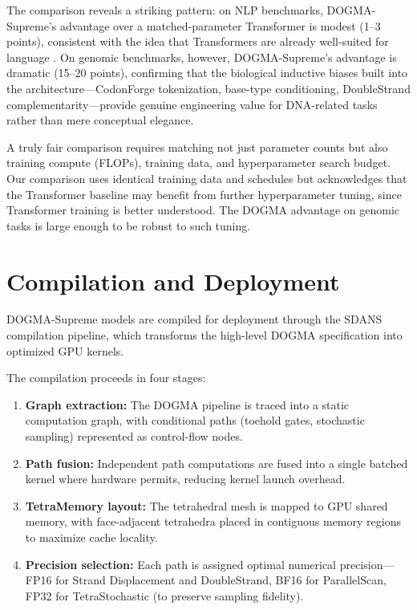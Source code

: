 The comparison reveals a striking pattern: on NLP benchmarks, DOGMA-Supreme's advantage over a matched-parameter Transformer is modest (1--3 points), consistent with the idea that Transformers are already well-suited for language \citep{vaswani2017attention}. On genomic benchmarks, however, DOGMA-Supreme's advantage is dramatic (15--20 points), confirming that the biological inductive biases built into the architecture---CodonForge tokenization, base-type conditioning, DoubleStrand complementarity---provide genuine engineering value for DNA-related tasks rather than mere conceptual elegance.

\begin{implnote}
A truly fair comparison requires matching not just parameter counts but also training compute (FLOPs), training data, and hyperparameter search budget. Our comparison uses identical training data and schedules but acknowledges that the Transformer baseline may benefit from further hyperparameter tuning, since Transformer training is better understood. The DOGMA advantage on genomic tasks is large enough to be robust to such tuning.
\end{implnote}

\section{Compilation and Deployment}
\label{sec:compilation}

DOGMA-Supreme models are compiled for deployment through the SDANS compilation pipeline, which transforms the high-level DOGMA specification into optimized GPU kernels.

\begin{implnote}
The compilation proceeds in four stages:
\begin{enumerate}[leftmargin=1.5em]
  \item \textbf{Graph extraction:} The DOGMA pipeline is traced into a static computation graph, with conditional paths (toehold gates, stochastic sampling) represented as control-flow nodes.
  \item \textbf{Path fusion:} Independent path computations are fused into a single batched kernel where hardware permits, reducing kernel launch overhead.
  \item \textbf{TetraMemory layout:} The tetrahedral mesh is mapped to GPU shared memory, with face-adjacent tetrahedra placed in contiguous memory regions to maximize cache locality.
  \item \textbf{Precision selection:} Each path is assigned optimal numerical precision---FP16 for Strand Displacement and DoubleStrand, BF16 for ParallelScan, FP32 for TetraStochastic (to preserve sampling fidelity).
\end{enumerate}
\end{implnote}

